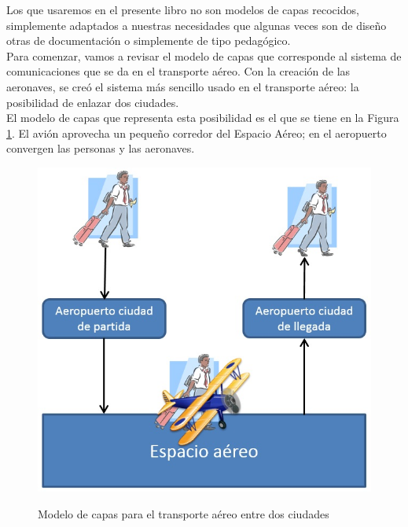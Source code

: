 Los que usaremos en el presente libro no son modelos de capas recocidos, simplemente adaptados a nuestras necesidades que algunas veces son de diseño otras de documentación o simplemente de tipo pedagógico. \\

Para comenzar, vamos a revisar el modelo de capas que corresponde al sistema de comunicaciones que se da en el transporte aéreo. Con la creación de las aeronaves, se creó el sistema más sencillo usado en el transporte aéreo: la posibilidad de enlazar dos ciudades. \\
El modelo de capas que representa esta posibilidad es el que se tiene en la Figura \ref{fig:modelo_aviacion}. El avión aprovecha un pequeño corredor del Espacio Aéreo; en el aeropuerto convergen las personas y las aeronaves. \\

\begin{figure}[h!]
	\captionsetup{justification = raggedright, singlelinecheck = false}
	\caption{Modelo de capas para el transporte aéreo entre dos ciudades} 
	\centering
	\includegraphics[scale=0.6]{Imagenes/modelo_aviacion}
	\label{fig:modelo_aviacion}
\end{figure}


